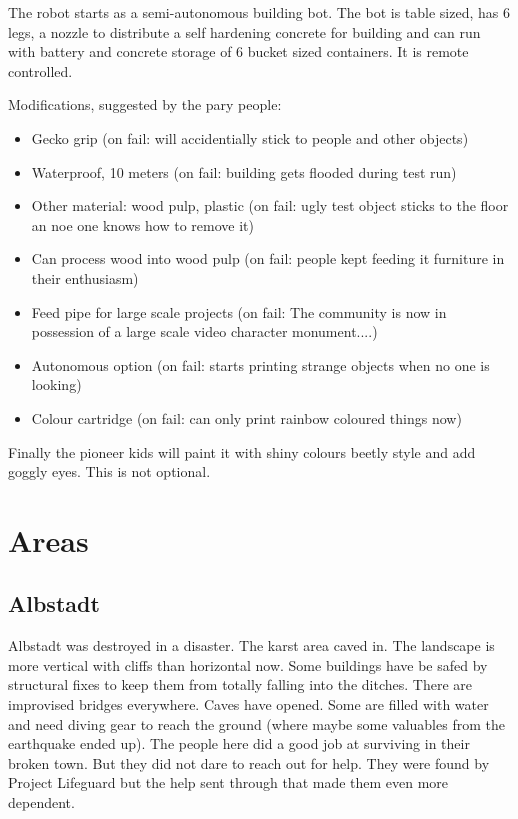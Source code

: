 The robot starts as a semi-autonomous building bot. The bot is table sized, has 6 legs, a nozzle to distribute a self hardening concrete for building and can run with battery and concrete storage of 6 bucket sized containers. It is remote controlled.

Modifications, suggested by the pary people:

\begin{itemize}
    \item Gecko grip (on fail: will accidentially stick to people and other objects)
    \item Waterproof, 10 meters (on fail: building gets flooded during test run)    
    \item Other material: wood pulp, plastic (on fail: ugly test object sticks to the floor an noe one knows how to remove it)
    \item Can process wood into wood pulp (on fail: people kept feeding it furniture in their enthusiasm)
    \item Feed pipe for large scale projects (on fail: The community is now in possession of a large scale video character monument....)
    \item Autonomous option (on fail: starts printing strange objects when no one is looking)
    \item Colour cartridge (on fail: can only print rainbow coloured things now)
\end{itemize}

Finally the pioneer kids will paint it with shiny colours beetly style and add goggly eyes. This is not optional.


\section{Areas}

\subsection{Albstadt}

Albstadt was destroyed in a disaster. The karst area caved in. The landscape is more vertical with cliffs than horizontal now. Some buildings have be safed by structural fixes to keep them from totally falling into the ditches. There are improvised bridges everywhere. Caves have opened. Some are filled with water and need diving gear to reach the ground (where maybe some valuables from the earthquake ended up).
The people here did a good job at surviving in their broken town. But they did not dare to reach out for help. They were found by Project Lifeguard but the help sent through that made them even more dependent.

